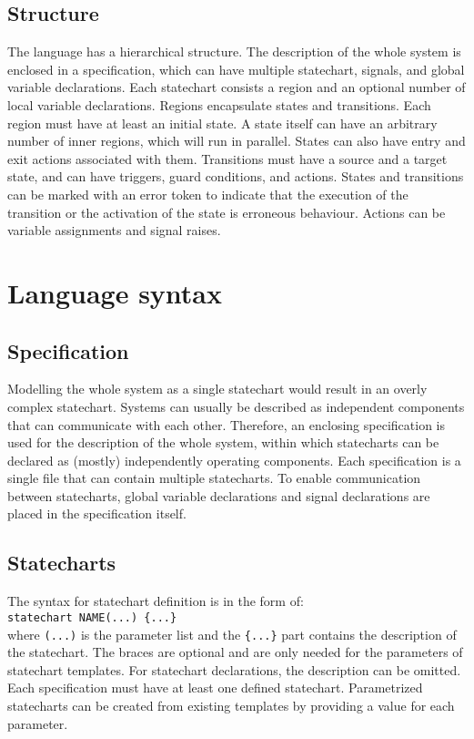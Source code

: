   \subsection{Structure}
The language has a hierarchical structure. The description of the whole system is enclosed in a specification, which can have multiple statechart, signals, and global variable declarations. Each statechart consists a region and an optional number of local variable declarations. Regions encapsulate states and transitions. Each region must have at least an initial state. A state itself can have an arbitrary number of inner regions, which will run in parallel. States can also have entry and exit actions associated with them. Transitions must have a source and a target state, and can have triggers, guard conditions, and actions. States and transitions can be marked with an error token to indicate that the execution of the transition or the activation of the state is erroneous behaviour. Actions can be variable assignments and signal raises.
\section{Language syntax}
  \subsection{Specification}
Modelling the whole system as a single statechart would result in an overly complex statechart. Systems can usually be described as independent components that can communicate with each other. Therefore, an enclosing specification is used for the description of the whole system, within which statecharts can be declared as (mostly) independently operating components. Each specification is a single file that can contain multiple statecharts. To enable communication between statecharts, global variable declarations and signal declarations are placed in the specification itself.
  \subsection{Statecharts}
The syntax for statechart definition is in the form of:
\\\verb!statechart NAME(...) {...}!\\
where \verb!(...)! is the parameter list and the \verb!{...}! part contains the description of the statechart. The braces are optional and are only needed for the parameters of statechart templates. For statechart declarations, the description can be omitted. Each specification must have at least one defined statechart. Parametrized statecharts can be created from existing templates by providing a value for each parameter.
